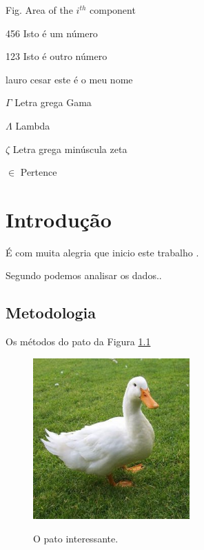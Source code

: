\documentclass[12pt,brazilian,twoside]{abntex2}
\begin{document}
\listoftables*
\cleardoublepage
 
\begin{siglas}
  \item[Fig.] Area of the $i^{th}$ component
  \item[456] Isto é um número
  \item[123] Isto é outro número
  \item[lauro cesar] este é o meu nome
\end{siglas}
 
\begin{simbolos}
  \item[$ \Gamma $] Letra grega Gama
  \item[$ \Lambda $] Lambda
  \item[$ \zeta $] Letra grega minúscula zeta
  \item[$ \in $] Pertence
\end{simbolos}
 
\tableofcontents*
\cleardoublepage

\textual
\chapter{Introdução}
É com muita alegria que inicio este trabalho \cite{ortega2010ritalina}. 

Segundo  podemos analisar os dados..
\section{Metodologia}
Os métodos do pato da Figura \ref{pato}
\begin{figure}[h]
\center
\caption{O pato interessante.}
\includegraphics[width=6cm]{pato}
\label{pato}
\end{figure}
\end{document}
